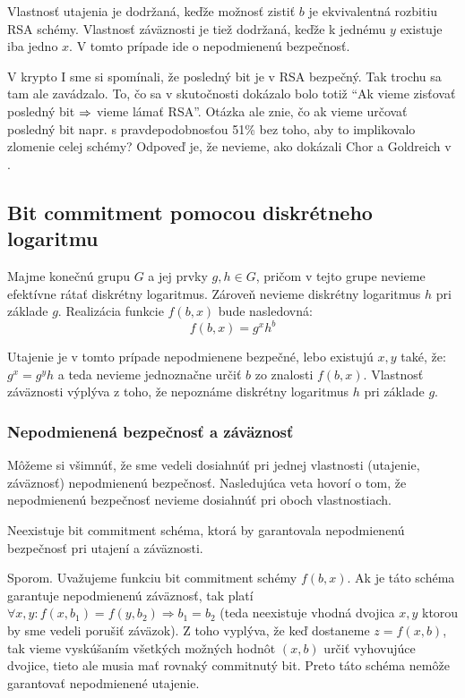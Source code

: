 Vlastnosť utajenia je dodržaná, keďže možnosť zistiť $b$
je ekvivalentná rozbitiu RSA schémy.
Vlastnosť záväznosti je tiež dodržaná,
keďže k jednému $y$ existuje iba jedno $x$.
V tomto prípade ide o nepodmienenú bezpečnosť.

\begin{poznamka}
    V krypto I sme si spomínali, že posledný bit je v RSA bezpečný.
    Tak trochu sa tam ale zavádzalo. To, čo sa v skutočnosti dokázalo
    bolo totiž ``Ak vieme zisťovať posledný bit $\Rightarrow$ vieme lámať
    RSA''. Otázka ale znie, čo ak vieme určovať posledný bit napr. s
    pravdepodobnosťou 51\% bez toho, aby to implikovalo zlomenie celej
    schémy? Odpoveď je, že nevieme, ako dokázali Chor a Goldreich v 
    \cite{rsa-lsb}.
\end{poznamka}

\subsection{Bit commitment pomocou diskrétneho logaritmu}
Majme konečnú grupu $G$ a jej prvky $g, h \in G$,
pričom v tejto grupe nevieme efektívne rátať diskrétny logaritmus. Zároveň
nevieme diskrétny logaritmus $h$ pri základe $g$.
Realizácia funkcie $f(b,x)$ bude nasledovná: 
\begin{equation*}
    f(b,x) = g^x h^b
\end{equation*}

Utajenie je v tomto prípade nepodmienene bezpečné,
lebo existujú $x, y$ také, že: $g^x = g^y h$ 
a teda nevieme jednoznačne určiť $b$ zo znalosti $f(b,x)$.
Vlastnosť záväznosti výplýva z toho, že nepoznáme
diskrétny logaritmus $h$ pri základe $g$.

\subsubsection{Nepodmienená bezpečnosť a záväznosť}
Môžeme si všimnúť, že sme vedeli dosiahnúť pri jednej vlastnosti 
(utajenie, záväznosť) nepodmienenú bezpečnosť.
Nasledujúca veta hovorí o tom, že nepodmienenú bezpečnosť 
nevieme dosiahnúť pri oboch vlastnostiach.

\begin{veta}
Neexistuje bit commitment schéma, ktorá by garantovala 
nepodmienenú bezpečnosť pri utajení a záväznosti.
\end{veta}

\begin{dokaz}
Sporom. 
Uvažujeme funkciu bit commitment schémy $f(b,x)$.
Ak je táto schéma garantuje nepodmienenú záväznosť, tak
platí $\forall x, y\colon f(x,b_1) = f(y,b_2) \Rightarrow b_1 = b_2$
(teda neexistuje vhodná dvojica
$x, y$ ktorou by sme vedeli porušiť záväzok).
Z toho vyplýva, že keď dostaneme $z = f(x,b)$, tak vieme 
vyskúšaním všetkých možných hodnôt $(x,b)$ určiť vyhovujúce dvojice,
tieto ale musia mať rovnaký commitnutý bit.
Preto táto schéma nemôže garantovať nepodmienené utajenie.
\end{dokaz}


